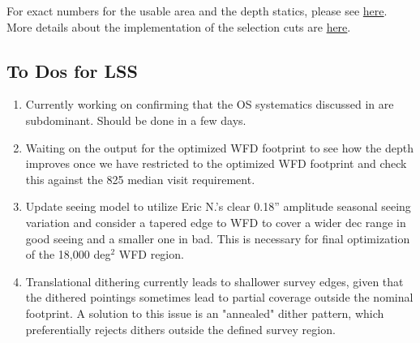 For exact numbers for the usable area and the depth statics, please see \href{https://github.com/LSSTDESC/ObsStrat/tree/static/static}{here}. More details about the implementation of the selection cuts are \href{https://github.com/LSSTDESC/ObsStrat/tree/static/static/depth\_cuts}{here}. 

\subsection{To Dos for LSS}
\begin{enumerate}
\item Currently working on confirming that the OS systematics discussed in \citet{Awan+2016} are subdominant. Should be done in a few days.
\item Waiting on the  output for the optimized WFD footprint to see how the depth improves once we have restricted to the optimized WFD footprint and check this against the 825 median visit requirement.
\item Update seeing model to utilize Eric N.'s clear 0.18'' amplitude seasonal seeing variation and consider a tapered edge to WFD to cover a wider dec range in good seeing and a smaller one in bad.  This is necessary for final optimization of the 18,000 deg$^2$ WFD region.
\item Translational dithering currently leads to shallower survey edges, given that the dithered pointings sometimes lead to partial coverage outside the nominal footprint. A solution to this issue is an "annealed" dither pattern, which preferentially rejects dithers outside the defined survey region.
\end{enumerate}


